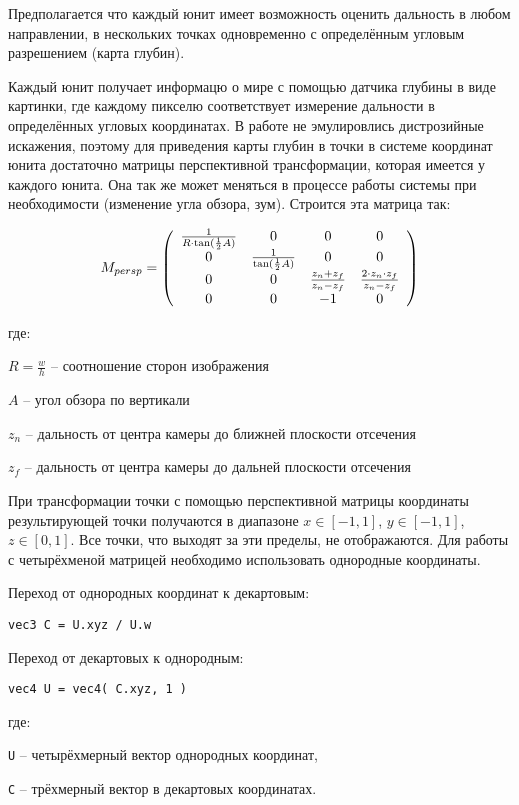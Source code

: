 Предполагается что каждый юнит имеет возможность
оценить дальность в любом направлении, в нескольких точках одновременно с определённым 
угловым разрешением (карта глубин).

Каждый юнит получает информацю о мире с помощью датчика глубины в виде картинки,
где каждому пикселю соответствует измерение дальности в определённых угловых координатах. В работе не эмулировлись
дистрозийные искажения, поэтому для приведения карты глубин в точки в системе координат юнита достаточно 
матрицы перспективной трансформации, которая имеется у каждого юнита. Она так же может меняться в процессе работы
системы при необходимости (изменение угла обзора, зум). Строится эта матрица так:

$$
M_{persp} = \left( \begin{array}{c c c c}
        \frac{1}{ R \cdot \tan( \frac{1}{2} A ) } & 0 & 0 & 0 \\
        0 & \frac{1}{ \tan( \frac{1}{2} A ) } & 0 & 0 \\
        0 & 0 & \frac{ z_{n} + z_{f} }{ z_{n}-z_{f} } & \frac{ 2 \cdot z_{n} \cdot z_{f} }{ z_{n} - z_{f} } \\
        0 & 0 & -1 & 0
\end{array} \right)
$$

где:

$R = \frac{w}{h}$ -- соотношение сторон изображения

$A$ -- угол обзора по вертикали

$z_{n}$ -- дальность от центра камеры до ближней плоскости отсечения

$z_{f}$ -- дальность от центра камеры до дальней плоскости отсечения

При трансформации точки с помощью перспективной матрицы координаты результирующей точки
получаются в диапазоне $x \in [-1,1]$, $y \in [-1,1]$, $z \in [0,1]$. Все точки, что выходят
за эти пределы, не отображаются. Для работы с четырёхменой матрицей необходимо использовать
однородные координаты.

Переход от однородных координат к декартовым: 

\verb|vec3 C = U.xyz / U.w|

Переход от декартовых к однородным:

\verb|vec4 U = vec4( C.xyz, 1 )|

где:

\verb|U| -- четырёхмерный вектор однородных координат,

\verb|C| -- трёхмерный вектор в декартовых координатах.


